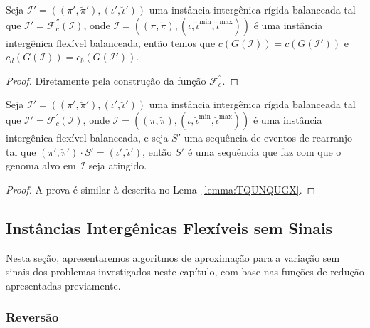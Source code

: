 

\begin{lemma}\label{lemma:PSGXFVHD}
Seja $\mathcal{I'} = ((\pi',\breve\pi'),(\iota',\breve\iota'))$ uma instância intergênica rígida balanceada tal que $\mathcal{I'} = \mathcal{F}_{c}^{''}(\mathcal{I})$, onde $\mathcal{I} = ((\pi,\breve\pi),(\iota,\breve\iota^{\min},\breve\iota^{\max}))$ é uma instância intergênica flexível balanceada, então temos que $c(G(\mathcal{I})) = c(G(\mathcal{I}'))$ e $c_d(G(\mathcal{I})) = c_b(G(\mathcal{I}'))$.
\end{lemma}
\begin{proof}
Diretamente pela construção da função $\mathcal{F}_{c}^{''}$.
\end{proof}

\begin{lemma}\label{lemma:WQOEFBXP}
Seja $\mathcal{I'} = ((\pi',\breve\pi'),(\iota',\breve\iota'))$ uma instância intergênica rígida balanceada tal que $\mathcal{I'} = \mathcal{F}_{c}^{'}(\mathcal{I})$, onde $\mathcal{I} = ((\pi,\breve\pi),(\iota,\breve\iota^{\min},\breve\iota^{\max}))$ é uma instância intergênica flexível balanceada, e seja $S'$ uma sequência de eventos de rearranjo tal que $(\pi',\breve\pi') \cdot S' = (\iota',\breve\iota')$, então $S'$ é uma sequência que faz com que o genoma alvo em $\mathcal{I}$ seja atingido.
\end{lemma}
\begin{proof}
A prova é similar à descrita no Lema~\ref{lemma:TQUNQUGX}.
\end{proof}

\subsection{Instâncias Intergênicas Flexíveis sem Sinais}

Nesta seção, apresentaremos algoritmos de aproximação para a variação sem sinais dos problemas investigados neste capítulo, com base nas funções de redução apresentadas previamente.

\subsubsection{Reversão}


